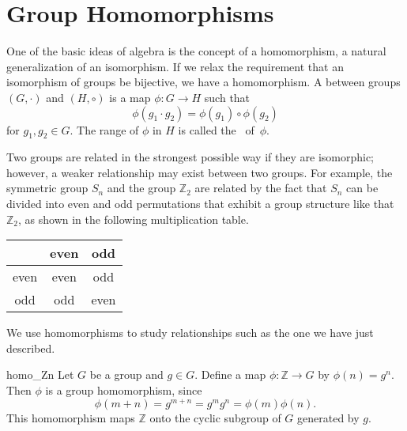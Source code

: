 
 
\section{Group Homomorphisms}
 
 
One of the basic ideas of algebra is the concept of a homomorphism, a
natural generalization of an isomorphism. If we relax the requirement
that an isomorphism of groups be bijective, we have a homomorphism.  A
 between groups $(G, \cdot)$ and $(H, \circ)$ is a map $\phi :
G \rightarrow H$ such that  
\[
\phi( g_1 \cdot g_2 ) = \phi( g_1 ) \circ \phi( g_2 )
\]
for $g_1, g_2 \in G$. The range of $\phi$ in $H$ is called the ~of~$\phi$.
 
 
Two groups are related in the strongest possible way if they are
isomorphic; however, a weaker relationship may exist between two
groups.  For example, the symmetric group $S_n$ and the group ${\mathbb
Z}_2$ are related by the fact that $S_n$ can be divided into even and
odd permutations that exhibit a group structure like that ${\mathbb
Z}_2$, as shown in the following multiplication table. 
\begin{center}
\begin{tabular}{c|cc}
            & even & odd \\
\hline
even & even & odd \\
odd  & odd  & even
\end{tabular}
\end{center}
We use homomorphisms to study relationships such as the one we have
just described.
 
 
\begin{example}{homo_Zn}
Let $G$ be a group and $g \in G$. Define a map $\phi : {\mathbb Z}
\rightarrow G$ by $\phi( n ) = g^n$. Then $\phi$ is a group
homomorphism, since 
\[
\phi( m + n ) = g^{ m + n} = g^m g^n = \phi( m ) \phi( n ).
\]
This homomorphism maps ${\mathbb Z}$ onto the cyclic subgroup of $G$
generated by $g$. 
\mbox{\hspace*{1in}}
\end{example}
 
